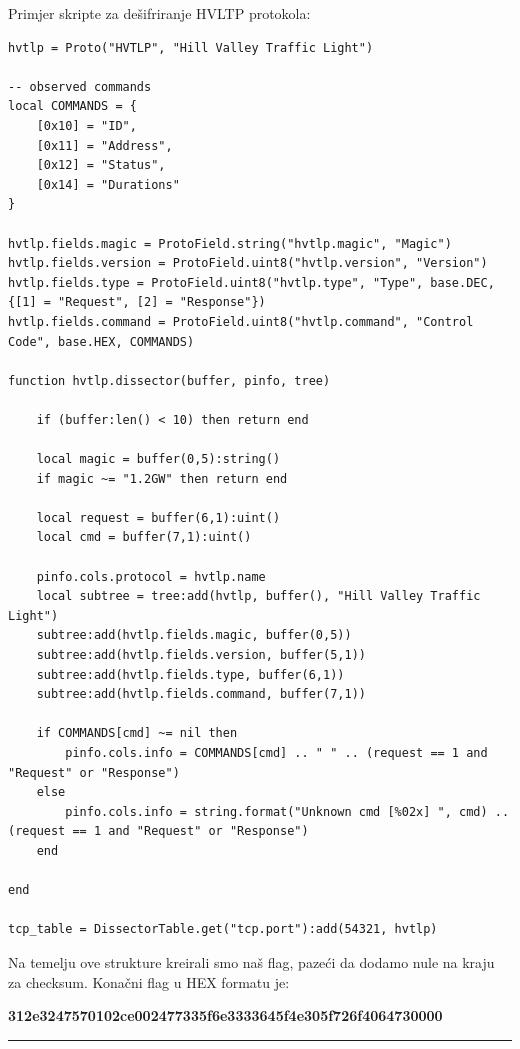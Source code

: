 \documentclass{article}
\begin{document}
Primjer skripte za dešifriranje HVLTP protokola:
\begin{verbatim}
hvtlp = Proto("HVTLP", "Hill Valley Traffic Light")

-- observed commands
local COMMANDS = {
    [0x10] = "ID",
    [0x11] = "Address",
    [0x12] = "Status",
    [0x14] = "Durations"
}

hvtlp.fields.magic = ProtoField.string("hvtlp.magic", "Magic")
hvtlp.fields.version = ProtoField.uint8("hvtlp.version", "Version")
hvtlp.fields.type = ProtoField.uint8("hvtlp.type", "Type", base.DEC, {[1] = "Request", [2] = "Response"})
hvtlp.fields.command = ProtoField.uint8("hvtlp.command", "Control Code", base.HEX, COMMANDS)

function hvtlp.dissector(buffer, pinfo, tree)

    if (buffer:len() < 10) then return end

    local magic = buffer(0,5):string()
    if magic ~= "1.2GW" then return end

    local request = buffer(6,1):uint()
    local cmd = buffer(7,1):uint()

    pinfo.cols.protocol = hvtlp.name
    local subtree = tree:add(hvtlp, buffer(), "Hill Valley Traffic Light")
    subtree:add(hvtlp.fields.magic, buffer(0,5))
    subtree:add(hvtlp.fields.version, buffer(5,1))
    subtree:add(hvtlp.fields.type, buffer(6,1))
    subtree:add(hvtlp.fields.command, buffer(7,1))

    if COMMANDS[cmd] ~= nil then
        pinfo.cols.info = COMMANDS[cmd] .. " " .. (request == 1 and "Request" or "Response")
    else
        pinfo.cols.info = string.format("Unknown cmd [%02x] ", cmd) .. (request == 1 and "Request" or "Response")
    end

end

tcp_table = DissectorTable.get("tcp.port"):add(54321, hvtlp)
\end{verbatim}

Na temelju ove strukture kreirali smo naš flag, pazeći da dodamo nule na kraju za checksum. Konačni flag u HEX formatu je:

\begin{center}
    \textbf{312e3247570102ce002477335f6e3333645f4e305f726f4064730000}
\end{center}

\noindent\rule{\textwidth}{0.4pt}


\newpage
\end{document}
